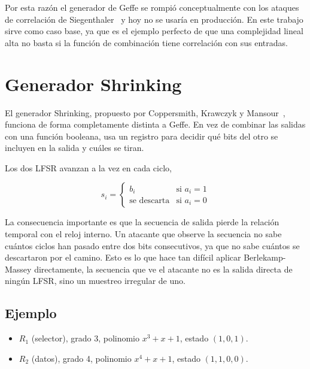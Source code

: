 Por esta razón el generador de Geffe se rompió conceptualmente con los ataques de correlación
de Siegenthaler~\cite{siegenthaler1985} y hoy no se usaría en producción.
En este trabajo sirve como caso base, ya que es el ejemplo perfecto de
que una complejidad lineal alta no basta si la función de combinación tiene correlación con sus entradas.

\section{Generador Shrinking}
\label{sec:shrinking}

El generador Shrinking, propuesto por Coppersmith, Krawczyk y Mansour~\cite{coppersmith1993}, funciona de forma completamente distinta a Geffe.
En vez de combinar las salidas con una función booleana, usa un registro para decidir qué bits del otro se incluyen en la salida y cuáles se tiran.

Los dos LFSR avanzan a la vez en cada ciclo,

\[
  s_i = \begin{cases} b_i & \text{si } a_i = 1 \\ \text{se descarta} & \text{si } a_i = 0 \end{cases}
\]

La consecuencia importante es que la secuencia de salida pierde la relación temporal con el reloj interno.
Un atacante que observe la secuencia no sabe cuántos ciclos han pasado entre dos bits consecutivos,
ya que no sabe cuántos se descartaron por el camino. Esto es lo que hace tan difícil aplicar Berlekamp-Massey directamente,
la secuencia que ve el atacante no es la salida directa de ningún LFSR, sino un muestreo irregular de uno.

\subsection{Ejemplo}

\begin{itemize}
  \item $R_1$ (selector), grado 3, polinomio $x^3 + x + 1$, estado $(1, 0, 1)$.
  \item $R_2$ (datos), grado 4, polinomio $x^4 + x + 1$, estado $(1, 1, 0, 0)$.
\end{itemize}

